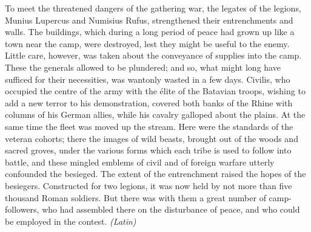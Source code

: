 
To meet the threatened dangers of the gathering war, the legates of the legions, Munius Lupercus and Numisius Rufus, strengthened their entrenchments and walls. The buildings, which during a long period of peace had grown up like a town near the camp, were destroyed, lest they might be useful to the enemy. Little care, however, was taken about the conveyance of supplies into the camp. These the generals allowed to be plundered; and so, what might long have sufficed for their necessities, was wantonly wasted in a few days. Civilis, who occupied the centre of the army with the élite of the Batavian troops, wishing to add a new terror to his demonstration, covered both banks of the Rhine with columns of his German allies, while his cavalry galloped about the plains. At the same time the fleet was moved up the stream. Here were the standards of the veteran cohorts; there the images of wild beasts, brought out of the woods and sacred groves, under the various forms which each tribe is used to follow into battle, and these mingled emblems of civil and of foreign warfare utterly confounded the besieged. The extent of the entrenchment raised the hopes of the besiegers. Constructed for two legions, it was now held by not more than five thousand Roman soldiers. But there was with them a great number of camp-followers, who had assembled there on the disturbance of peace, and who could be employed in the contest. \emph{(Latin)}


